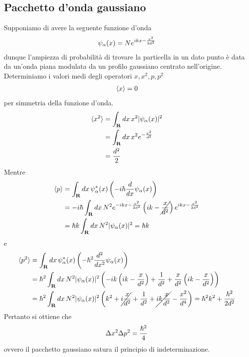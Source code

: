 \documentclass{article}
\begin{document}
\subsection{Pacchetto d'onda gaussiano}
Supponiamo di avere la seguente funzione d'onda
\begin{gather}
    \psi_\alpha(x) = Ne^{ikx - \frac{x^2}{2d^2}} \notag
\end{gather}
dunque l'ampiezza di probabilità di trovare la particella in un dato punto è data da un'onda piana modulata da un profilo gaussiano centrato nell'origine. Determiniamo i valori medi degli operatori $x, x^2, p, p^2$
\begin{gather}
    \braket{x} = 0 \notag
\end{gather}
per simmetria della funzione d'onda.
\begin{align}
    \braket{x^2} &= \int_{\mathbf{R}} dx \, x^2|\psi_\alpha(x)|^2 \notag \\
    &= \int_{\mathbf{R}} dx \, x^2e^{-\frac{x^2}{d^2}} \notag \\
    &= \frac{d^2}{2} \notag
\end{align}
Mentre
\begin{align}
    \braket{p} &= \int_{\mathbf{R}} dx \, \psi_\alpha^*(x)\left( -i\hbar \frac{d}{dx}\psi_\alpha(x) \right) \notag \\
    &= -i\hbar \int_\mathbf{R} dx \, N^2e^{-ikx - \frac{x^2}{2d^2}}\left( ik - \cancel{\frac{x}{d^2}} \right)e^{ikx - \frac{x^2}{2d^2}} \notag \\
    &= \hbar k \int_{\mathbf{R}} dx \, N^2|\psi_\alpha(x)|^2 = \hbar k \notag
\end{align}
e
\begin{align}
    \braket{p^2} &= \int_{\mathbf{R}} dx \, \psi_\alpha^*(x)\left( -\hbar^2\frac{d^2}{dx^2}\psi_\alpha(x) \right) \notag \\
    &= \hbar^2\int_{\mathbf{R}} dx \, N^2|\psi_\alpha(x)|^2\left(-ik\left(ik - \frac{x}{d^2} \right) + \frac{1}{d^2} + \frac{x}{d^2}\left( ik - \frac{x}{d^2} \right) \right) \notag \\
    &= \hbar^2\int_{\mathbf{R}} dx \, N^2|\psi_\alpha(x)|^2\left( k^2 + \cancel{i\frac{x}{d^2}} + \frac{1}{d^2} + \cancel{ik\frac{x}{d^2}} - \frac{x^2}{d^4} \right) = \hbar^2 k^2 + \frac{\hbar^2}{2d^2} \notag
\end{align}
Pertanto si ottiene che
\begin{gather}
    \Delta x^2 \Delta p^2 = \frac{\hbar^2}{4} \notag
\end{gather}
ovvero il pacchetto gaussiano satura il principio di indeterminazione.
\end{document}

